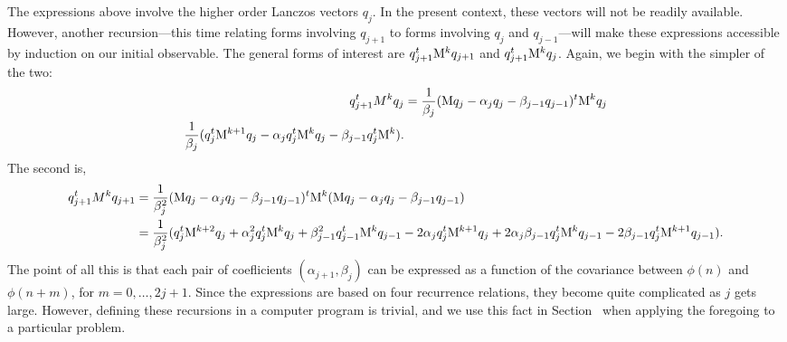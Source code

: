 The expressions above involve the higher order Lanczos vectors $q_j$. In the present context,
these vectors will not be readily available. However, another recursion---this time relating forms
involving $q_{j+1}$ to forms involving $q_j$ and $q_{j-1} $---will make these
expressions accessible by induction on our initial observable. The general forms
of interest are $q_{j+1}^t\mathrm{M}^k q_{j+1}$ and $q^t_{j+1}\mathrm{M}^k q_j$. Again, we 
begin with the simpler of the two:
\begin{align*}
  q_{j+1}^tM^kq_j &= 
 \frac{1}{\beta_j}(\mathrm{M} q_j - \alpha_j q_j - \beta_{j-1} q_{j-1})^t\mathrm{M}^k q_j\\
 \frac{1}{\beta_j}(q_j^t\mathrm{M}^{k+1} q_j - \alpha_j q_j^t\mathrm{M}^{k} q_j -\beta_{j-1} q_j^t\mathrm{M}^k).
\end{align*}
The second is,
\begin{align}
\label{eq:4.12}
  q_{j+1}^tM^kq_{j+1} 
&=  \frac{1}{\beta_j^2}(\mathrm{M} q_j - \alpha_j q_j - \beta_{j-1} q_{j-1})^t\mathrm{M}^k 
  (\mathrm{M} q_j - \alpha_j q_j - \beta_{j-1} q_{j-1})\nonumber\\
&=  \frac{1}{\beta_j^2}(q_j^t\mathrm{M}^{k+2} q_j + \alpha^2_jq_j^t\mathrm{M}^{k} q_j 
  + \beta^2_{j-1} q_{j-1}^t\mathrm{M}^k q_{j-1} 
    - 2\alpha_jq_j^t\mathrm{M}^{k+1} q_j
    + 2\alpha_j \beta_{j-1}q_j^t\mathrm{M}^k q_{j-1}
    - 2\beta_{j-1}q_j^t \mathrm{M}^{k+1}q_{j-1}).
\end{align}
The point of all this is that each pair of coeﬂicients $(\alpha_{j+1}, \beta_j)$
can be expressed as a function of the covariance between 
$\phi(n)$ and $\phi(n+ m)$, for $m = 0, \dots, 2j+1$. Since the expressions
are based on four recurrence relations, they become quite complicated as $j$ gets large. However,
defining these recursions in a computer program is trivial, and we use this fact
in Section~\label{sec:computations} %
when applying the foregoing to a particular problem.
%
%
%
%

